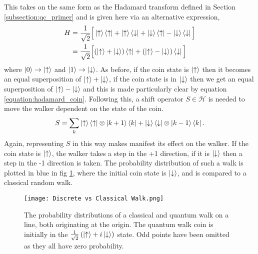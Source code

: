 This takes on the same form as the Hadamard transform defined in Section \ref{subsection:qc_primer} and is given here via an alternative expression,
\begin{align}
    H &= \frac{1}{\sqrt{2}}\Big[
    \ket{\uparrow}\bra{\uparrow} +
    \ket{\uparrow}\bra{\downarrow} +
    \ket{\downarrow}\bra{\uparrow} -
    \ket{\downarrow}\bra{\downarrow}\Big]\\
    &= \frac{1}{\sqrt{2}}\Big[(\ket{\uparrow} + \ket{\downarrow})\bra{\uparrow} +
    (\ket{\uparrow} - \ket{\downarrow})\bra{\downarrow}\Big]
    \label{equation:hadamard_coin}
\end{align}
where $\ket{0} \rightarrow \ket{\uparrow}$ and $\ket{1} \rightarrow \ket{\downarrow}$.
As before, if the coin state is $\ket{\uparrow}$ then it becomes an equal superposition of $\ket{\uparrow} + \ket{\downarrow}$, if the coin state is in $\ket{\downarrow}$ then we get an equal superposition of $\ket{\uparrow} - \ket{\downarrow}$ and this is made particularly clear by equation \ref{equation:hadamard_coin}.
Following this, a shift operator $S \in \mathcal{H}$ is needed to move the walker dependent on the state of the coin.
\begin{equation}
    S = \sum_k \ket{\uparrow}\bra{\uparrow} \otimes \ket{k + 1}\bra{k} + \ket{\downarrow}\bra{\downarrow} \otimes \ket{k - 1}\bra{k}.
\end{equation}
Again, representing $S$ in this way makes manifest its effect on the walker. 
If the coin state is $\ket{\uparrow}$, the walker takes a step in the +1 direction, if it is $\ket{\downarrow}$ then a step in the -1 direction is taken.
The probability distribution of such a walk is plotted in blue in fig \ref{fig:discVSclass}, where the initial coin state is $\ket{\downarrow}$, and is compared to a classical random walk.\newline

\begin{figure}
    \centering
    \texttt{[image: Discrete vs Classical Walk.png]}
    \caption{The probability distributions of a classical and quantum walk on a line, both originating at the origin. The quantum walk coin is initially in the $\frac{1}{\sqrt{2}}\left(\ket{\uparrow} + i\ket{\downarrow}\right)$ state. Odd points have been omitted as they all have zero probability.}
    \label{fig:discVSclass}
\end{figure}

